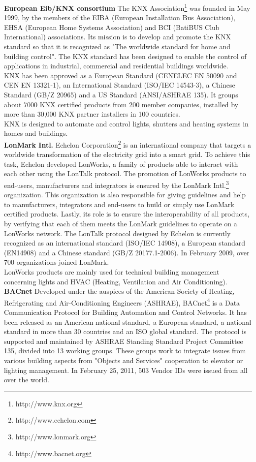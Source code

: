 {\bf European Eib/KNX consortium} The KNX Association\footnote{http://www.knx.org} was founded in May 1999, by the members of the EIBA (European Installation Bus Association), EHSA (European Home Systems Association) and BCI (BatiBUS Club International) associations. Its mission is to develop and promote the KNX standard so that it is recognized as "The worldwide standard for home and building control". The KNX standard has been designed to enable the control of applications in industrial, commercial and residential buildings worldwide.\\
KNX has been approved as a European Standard (CENELEC EN 50090 and CEN EN 13321-1), an International Standard (ISO/IEC 14543-3), a Chinese Standard (GB/Z 20965) and a US Standard (ANSI/ASHRAE 135). It groups about 7000 KNX certified products from 200 member companies, installed by more than 30,000 KNX partner installers in 100 countries.\\
KNX is designed to automate and control lights, shutters and heating systems in homes and buildings.\\

{\bf LonMark Intl.} Echelon Corporation\footnote{http://www.echelon.com} is an international company that targets a worldwide transformation of the electricity grid into a smart grid. To achieve this task, Echelon developed LonWorks, a family of products able to interact with each other using the LonTalk protocol. The promotion of LonWorks products to end-users, manufacturers and integrators is ensured by the LonMark Intl.\footnote{http://www.lonmark.org} organization. This organization is also responsible for giving guidelines and help to manufacturers, integrators and end-users to build or simply use LonMark certified products. Lastly, its role is to ensure the interoperability of all products, by verifying that each of them meets the LonMark guidelines to operate on a LonWorks network. The LonTalk protocol designed by Echelon is currently recognized as an international standard (ISO/IEC 14908), a European standard (EN14908) and a Chinese standard (GB/Z 20177.1-2006). In February 2009, over 700 organizations joined LonMark.\\
LonWorks products are mainly used for technical building management concerning lights and HVAC (Heating, Ventilation and Air Conditioning).\\

{\bf BACnet} Developed under the auspices of the American Society of Heating, Refrigerating and Air-Conditioning Engineers (ASHRAE), BACnet\footnote{http://www.bacnet.org} is a Data Communication Protocol for Building Automation and Control Networks. It has been released as an American national standard, a European standard, a national standard in more than 30 countries and an ISO global standard. The protocol is supported and maintained by ASHRAE Standing Standard Project Committee 135, divided into 13 working groups. These groups work to integrate issues from various building aspects from "Objects and Services" cooperation to elevator or lighting management. In February 25, 2011, 503 Vendor IDs were issued from all over the world.\\

